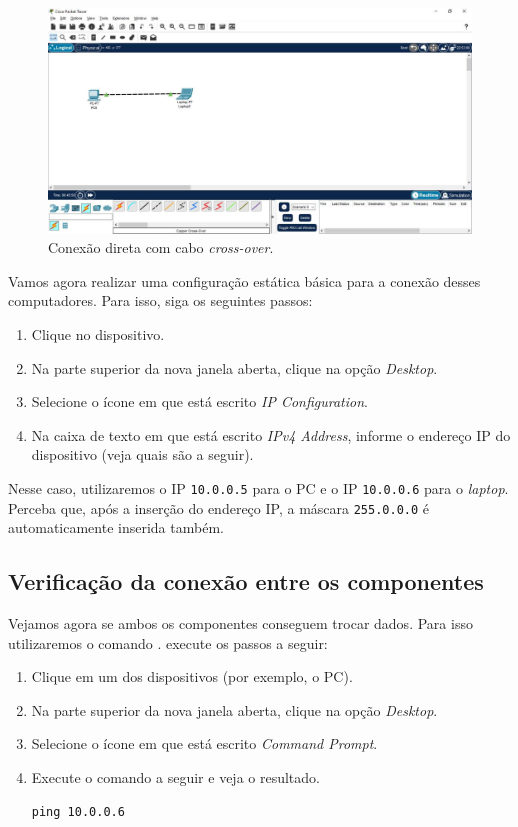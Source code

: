 \begin{figure}
    \centering
    \includegraphics[width=.99\textwidth]{Figuras/ConexaoCrossover}
    \caption{Conexão direta com cabo \textit{cross-over}.}\label{fig:conexaoCrossover}
\end{figure}

Vamos agora realizar uma configuração estática básica para a conexão desses computadores. Para isso, siga os seguintes passos:

\begin{enumerate}
    \item Clique no dispositivo.
    \item Na parte superior da nova janela aberta, clique na opção \textit{Desktop}.
    \item Selecione o ícone em que está escrito \textit{IP Configuration}.
    \item Na caixa de texto em que está escrito \textit{IPv4 Address}, informe o endereço IP do dispositivo (veja quais são a seguir).
\end{enumerate}

Nesse caso, utilizaremos o IP \texttt{10.0.0.5} para o PC e o IP \texttt{10.0.0.6} para o \textit{laptop}. Perceba que, após a inserção do endereço IP, a máscara \texttt{255.0.0.0} é automaticamente inserida também.

\subsection{Verificação da conexão entre os componentes}\label{subsec:verificaConex}
Vejamos agora se ambos os componentes conseguem trocar dados. Para isso utilizaremos o comando . execute os passos a seguir:

\begin{enumerate}
    \item Clique em um dos dispositivos (por exemplo, o PC).
    \item Na parte superior da nova janela aberta, clique na opção \textit{Desktop}.
    \item Selecione o ícone em que está escrito \textit{Command Prompt}.
    \item Execute o comando a seguir e veja o resultado.
    \begin{lstlisting}[style=MyBashStyle]
ping 10.0.0.6
    \end{lstlisting}
\end{enumerate}

